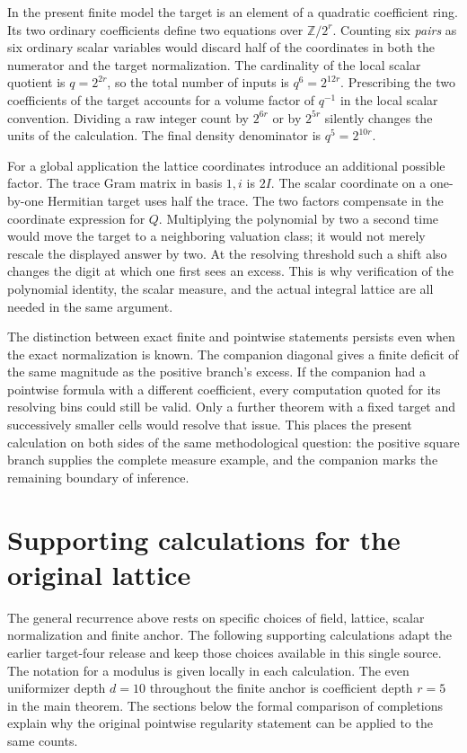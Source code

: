 \documentclass[12pt,letterpaper]{article}
\begin{document}
In the present finite model the target is an element of a quadratic coefficient ring. Its two ordinary coefficients define two equations over $\mathbb Z/2^r$. Counting six \emph{pairs} as six ordinary scalar variables would discard half of the coordinates in both the numerator and the target normalization. The cardinality of the local scalar quotient is $q=2^{2r}$, so the total number of inputs is $q^6=2^{12r}$. Prescribing the two coefficients of the target accounts for a volume factor of $q^{-1}$ in the local scalar convention. Dividing a raw integer count by $2^{6r}$ or by $2^{5r}$ silently changes the units of the calculation. The final density denominator is $q^5=2^{10r}$.

For a global application the lattice coordinates introduce an additional possible factor. The trace Gram matrix in basis $1,i$ is $2I$. The scalar coordinate on a one-by-one Hermitian target uses half the trace. The two factors compensate in the coordinate expression for $Q$. Multiplying the polynomial by two a second time would move the target to a neighboring valuation class; it would not merely rescale the displayed answer by two. At the resolving threshold such a shift also changes the digit at which one first sees an excess. This is why verification of the polynomial identity, the scalar measure, and the actual integral lattice are all needed in the same argument.

The distinction between exact finite and pointwise statements persists even when the exact normalization is known. The companion diagonal gives a finite deficit of the same magnitude as the positive branch's excess. If the companion had a pointwise formula with a different coefficient, every computation quoted for its resolving bins could still be valid. Only a further theorem with a fixed target and successively smaller cells would resolve that issue. This places the present calculation on both sides of the same methodological question: the positive square branch supplies the complete measure example, and the companion marks the remaining boundary of inference.

\section{Supporting calculations for the original lattice}
The general recurrence above rests on specific choices of field, lattice, scalar normalization and finite anchor. The following supporting calculations adapt the earlier target-four release and keep those choices available in this single source. The notation for a modulus is given locally in each calculation. The even uniformizer depth $d=10$ throughout the finite anchor is coefficient depth $r=5$ in the main theorem. The sections below the formal comparison of completions explain why the original pointwise regularity statement can be applied to the same counts.
\end{document}
